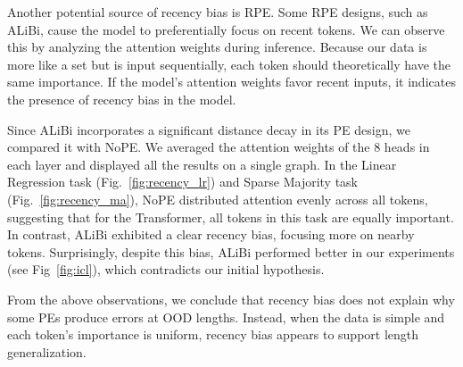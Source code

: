 \documentclass[letterpaper]{article} %
\begin{document}
Another potential source of recency bias is RPE. Some RPE designs, such as ALiBi, cause the model to preferentially focus on recent tokens. We can observe this by analyzing the attention weights during inference. Because our data is more like a set but is input sequentially, each token should theoretically have the same importance. If the model's attention weights favor recent inputs, it indicates the presence of recency bias in the model.

Since ALiBi incorporates a significant distance decay in its PE design, we compared it with NoPE. We averaged the attention weights of the 8 heads in each layer and displayed all the results on a single graph. In the Linear Regression task (Fig.~\ref{fig:recency_lr}) and Sparse Majority task (Fig.~\ref{fig:recency_ma}), NoPE distributed attention evenly across all tokens, suggesting that for the Transformer, all tokens in this task are equally important. In contrast, ALiBi exhibited a clear recency bias, focusing more on nearby tokens. Surprisingly, despite this bias, ALiBi performed better in our experiments (see Fig~\ref{fig:icl}), which contradicts our initial hypothesis.

From the above observations, we conclude that recency bias does not explain why some PEs produce errors at OOD lengths. Instead, when the data is simple and each token's importance is uniform, recency bias appears to support length generalization.
\end{document}
